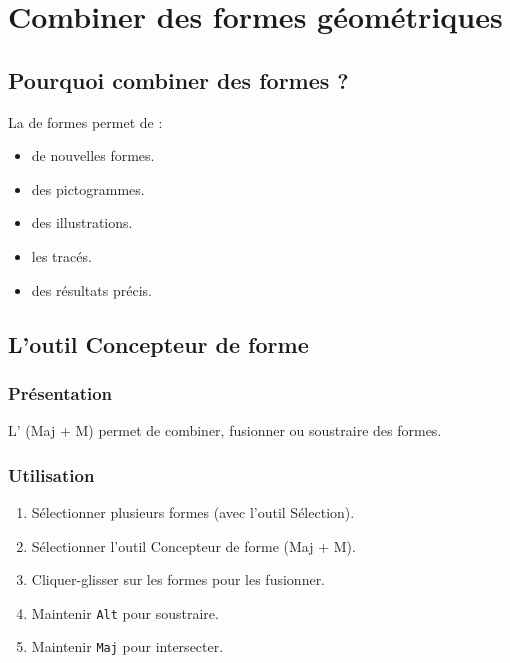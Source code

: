\section{Combiner des formes géométriques}

\subsection{Pourquoi combiner des formes ?}

La  de formes permet de :

\begin{itemize}
    \item {} de nouvelles formes.
    \item {} des pictogrammes.
    \item {} des illustrations.
    \item {} les tracés.
    \item {} des résultats précis.
\end{itemize}

\subsection{L'outil Concepteur de forme}

\subsubsection{Présentation}

L' (Maj + M) permet de combiner, fusionner ou soustraire des formes.

\subsubsection{Utilisation}

\begin{enumerate}
    \item Sélectionner plusieurs formes (avec l'outil Sélection).
    \item Sélectionner l'outil Concepteur de forme (Maj + M).
    \item Cliquer-glisser sur les formes pour les fusionner.
    \item Maintenir \texttt{Alt} pour soustraire.
    \item Maintenir \texttt{Maj} pour intersecter.
\end{enumerate}

